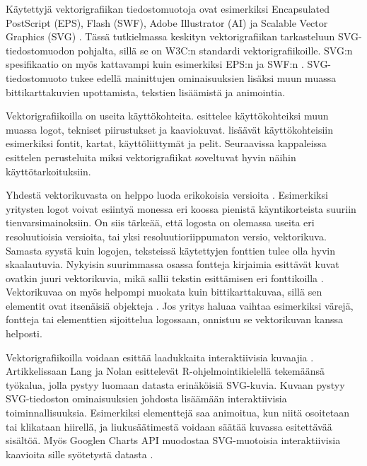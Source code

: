 \documentclass[utf8,bachelor]{gradu3}
\begin{document}
Käytettyjä vektorigrafiikan tiedostomuotoja ovat esimerkiksi Encapsulated PostScript (EPS), Flash (SWF), Adobe Illustrator (AI) ja Scalable Vector Graphics (SVG) \parencite{RefWorks:doc:5bdc5224e4b05afcfde5b159}. Tässä tutkielmassa keskityn vektorigrafiikan tarkasteluun SVG-tiedostomuodon pohjalta, sillä se on W3C:n standardi vektorigrafiikoille. SVG:n spesifikaatio on myös kattavampi kuin esimerkiksi EPS:n \parencite{RefWorks:doc:5bdc900de4b0afdabde32fb7} ja SWF:n \parencite{RefWorks:doc:5bdc9306e4b069b454d8459e}. SVG-tiedostomuoto tukee edellä mainittujen ominaisuuksien lisäksi muun muassa bittikarttakuvien upottamista, tekstien lisäämistä ja animointia. \parencite{RefWorks:doc:5bd74719e4b0e42e08f6333b}

Vektorigrafiikoilla on useita käyttökohteita. \textcite{RefWorks:doc:5bdc5224e4b05afcfde5b159} esittelee käyttökohteiksi muun muassa logot, tekniset piirustukset ja kaaviokuvat. \textcite{RefWorks:doc:5bdd9b5ae4b0954dddb26329} lisäävät käyttökohteisiin esimerkiksi fontit, kartat, käyttöliittymät ja pelit. Seuraavissa kappaleissa esittelen perusteluita miksi vektorigrafiikat soveltuvat hyvin näihin käyttötarkoituksiin.

Yhdestä vektorikuvasta on helppo luoda erikokoisia versioita \parencite{RefWorks:doc:5bdc5224e4b05afcfde5b159}. Esimerkiksi yritysten logot voivat esiintyä monessa eri koossa pienistä käyntikorteista suuriin tienvarsimainoksiin. On siis tärkeää, että logosta on olemassa useita eri resoluutioisia versioita, tai yksi resoluutioriippumaton versio, vektorikuva. Samasta syystä kuin logojen, teksteissä käytettyjen fonttien tulee olla hyvin skaalautuvia. Nykyisin suurimmassa osassa fontteja kirjaimia esittävät kuvat ovatkin juuri vektorikuvia, mikä sallii tekstin esittämisen eri fonttikoilla \parencite{RefWorks:doc:5bdc5224e4b05afcfde5b159}. Vektorikuvaa on myös helpompi muokata kuin bittikarttakuvaa, sillä sen elementit ovat itsenäisiä objekteja \parencite{RefWorks:doc:5bdc5224e4b05afcfde5b159}. Jos yritys haluaa vaihtaa esimerkiksi värejä, fontteja tai elementtien sijoittelua logossaan, onnistuu se vektorikuvan kanssa helposti.

Vektorigrafiikoilla voidaan esittää laadukkaita interaktiivisia kuvaajia \parencite{RefWorks:doc:5bdc736ae4b05afcfde5d6e4}. Artikkelissaan Lang ja Nolan esittelevät R-ohjelmointikielellä tekemäänsä työkalua, jolla pystyy luomaan datasta erinäköisiä SVG-kuvia. Kuvaan pystyy SVG-tiedoston ominaisuuksien johdosta lisäämään interaktiivisia toiminnallisuuksia. Esimerkiksi elementtejä saa animoitua, kun niitä osoitetaan tai klikataan hiirellä, ja liukusäätimestä voidaan säätää kuvassa esitettävää sisältöä. \parencite{RefWorks:doc:5bdc736ae4b05afcfde5d6e4} Myös Googlen Charts API muodostaa SVG-muotoisia interaktiivisia kaavioita sille syötetystä datasta \parencite{RefWorks:doc:5bde1508e4b0afdabde34e20}.
\end{document}
